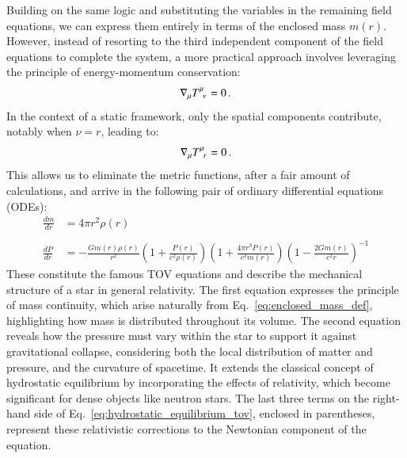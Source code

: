 \documentclass[main.tex]{subfiles}
\begin{document}
     Building on the same logic and substituting the variables in the remaining field equations, we can express them entirely in terms of the enclosed mass $m(r)$. However, instead of resorting to the third independent component of the field equations to complete the system, a more practical approach involves leveraging the principle of energy-momentum conservation:
     \begin{equation}
        \nabla_\mu T\indices{^\mu_\nu} = 0\,.
     \end{equation}
     In the context of a static framework, only the spatial components contribute, notably when $\nu = r$, leading to:
     \begin{equation}
         \nabla_\mu T\indices{^\mu_r} = 0\,.
     \end{equation}
     This allows us to eliminate the metric functions, after a fair amount of calculations, and arrive in the following pair of ordinary differential equations (ODEs):
     \begin{align}
         \frac{dm}{dr} &= 4\pi r^2 \rho(r) \label{eq:mass_continuity_tov} \\\nonumber\\ 
         \frac{dP}{dr} &= - \frac{Gm(r)\rho(r)}{r^2}\left(1 + \frac{P(r)}{c^2\rho(r)}\right)\left(1 + \frac{4\pi r^3 P(r)}{c^2 m(r)}\right)\left(1 - \frac{2Gm(r)}{c^2r}\right)^{-1} 
         \label{eq:hydrostatic_equilibrium_tov}
     \end{align}
     These constitute the famous TOV equations and describe the mechanical structure of a star in general relativity. The first equation expresses the principle of mass continuity, which arise naturally from Eq.~\eqref{eq:enclosed_mass_def}, highlighting how mass is distributed throughout its volume.
     The second equation reveals how the pressure must vary within the star to support it against gravitational collapse, considering both the local distribution of matter and pressure, and the curvature of spacetime. It extends the classical concept of hydrostatic equilibrium by incorporating the effects of relativity, which become significant for dense objects like neutron stars. The last three terms on the right-hand side of Eq.~\eqref{eq:hydrostatic_equilibrium_tov}, enclosed in parentheses, represent these relativistic corrections to the Newtonian component of the equation. 
\end{document}
